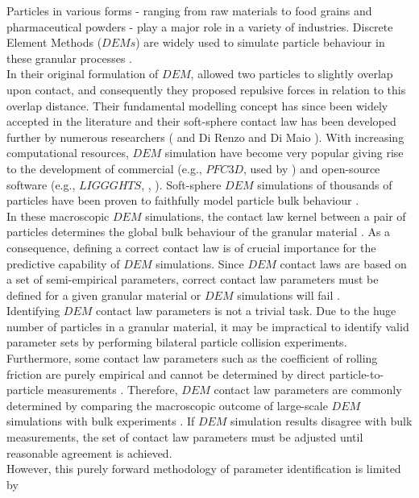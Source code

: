 \documentclass{CFD2015}
\begin{document}
Particles in various forms - ranging from raw materials to food grains and pharmaceutical powders - 
play a major role in a variety of industries. 
Discrete Element Methods ($DEMs$) are widely used to simulate
particle behaviour in these granular processes \cite{RefWorks:130}.\\
In their original formulation of $DEM$, \citet{RefWorks:172} allowed two 
particles to slightly overlap upon contact, and consequently they proposed
repulsive forces in relation to this overlap distance.
Their fundamental modelling concept has since been widely accepted in the
literature and their soft-sphere contact law has been developed further by
numerous researchers (\citet{RefWorks:148} and Di Renzo and Di Maio
\citet{RefWorks:145}).
With increasing computational resources, $DEM$ simulation have become very
popular giving rise to the development of commercial (e.g., $PFC3D$, used by
\citet{RefWorks:87}) and open-source software (e.g.,
$LIGGGHTS$, \citet{RefWorks:136}, \citet{RefWorks:139}).
Soft-sphere $DEM$ simulations of thousands of particles have been proven to 
faithfully model particle bulk behaviour \cite{RefWorks:136}. \\
In these macroscopic $DEM$ simulations, the contact law kernel between a 
pair of particles determines the global bulk behaviour of the granular material \cite{RefWorks:131}. 
As a consequence, defining a correct contact law is of crucial importance for the predictive 
capability of $DEM$ simulations. 
Since $DEM$ contact laws are based 
on a set of semi-empirical parameters, correct contact law 
parameters must be defined for a given granular material
or $DEM$ simulations will fail \cite{RefWorks:177}. \\
Identifying $DEM$ contact law parameters is not a trivial task. 
Due to the huge number of particles in a granular material, it
may be impractical to identify valid parameter sets by performing bilateral 
particle collision experiments. 
Furthermore, some contact law parameters such as the coefficient of rolling
friction are purely empirical and cannot be determined by direct 
particle-to-particle measurements \cite{RefWorks:87}.
Therefore, $DEM$ contact law parameters are
commonly determined by comparing the macroscopic outcome of large-scale $DEM$ simulations with 
bulk experiments \cite{RefWorks:91}. 
If $DEM$ simulation results disagree with bulk measurements, the set of contact
law parameters must be adjusted until reasonable agreement is achieved.\\
However, this purely forward methodology of parameter identification is limited by 
\end{document}
